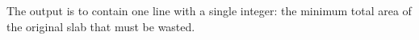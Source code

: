 The output is to contain one line with a single integer: the minimum total area of the original slab that must be wasted. 